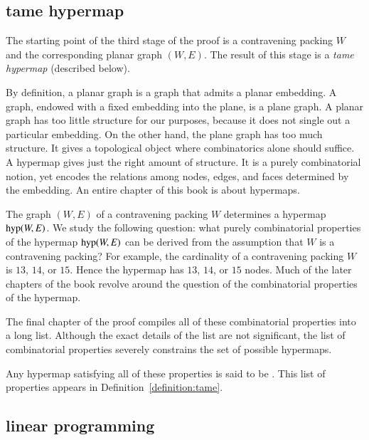 \subsection{tame hypermap}

The starting point of the third stage of the proof is a contravening
packing $W$ and the corresponding planar graph $(W,E)$.  The result of
this stage is a {\it tame hypermap} (described below).

By definition, a planar graph is a graph that admits a planar
embedding.  A graph, endowed with a fixed embedding into the plane, is a plane
graph.  A planar graph has too little structure for our purposes,
because it does not single out a particular embedding.  On the other
hand, the plane graph has too much structure.  It gives a topological
object where combinatorics alone should suffice.  A hypermap gives
just the right amount of structure.  It is a purely combinatorial
notion, yet encodes the relations among nodes, edges, and faces determined
by the embedding.  An entire
chapter of this book is about hypermaps.

The graph $(W,E)$ of a contravening packing $W$ determines a hypermap
${\operatorname{hyp}}(W,E)$. We study the following question: what  purely
combinatorial properties of the hypermap ${\operatorname{hyp}}(W,E)$ can be derived from
the assumption  that
$W$ is a contravening packing?  For example, the cardinality of a
contravening packing $W$ is $13$, $14$, or $15$.  Hence the hypermap
has $13$, $14$, or $15$ nodes.  Much of the later chapters of the book
revolve around the question of the combinatorial properties of the
hypermap.

The final chapter of the proof compiles all of these combinatorial
properties into a long list.  
Although the exact details of the list are not significant,
the list of combinatorial properties severely constrains the set of possible
hypermaps.  

Any hypermap satisfying all of these properties is said to be
.  This list of properties appears in
Definition~\ref{definition:tame}.


\subsection{linear programming}

